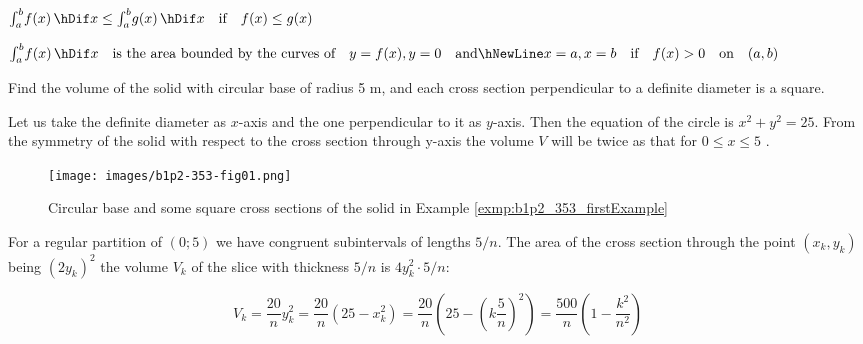 \documentclass[11pt]{amsbook}
\begin{document}

	\begin{hEnumerateArabic}
		\item
		$ 
		\int_{a}^{b} \! f(x) \, \hDif x
		\leq
		\int_{a}^{b} \! g(x) \, \hDif x
		\quad \text{if} \quad
		f(x) \leq g(x)
		$

		\item
		$
		\int_{a}^{b} \! f(x) \, \hDif x
		\quad \text{is the area bounded by the curves of} \quad
		y = f(x), y = 0
		\quad \text{and} \hNewLine
		x = a, x = b
		\quad \text{if} \quad
		f(x) > 0
		\quad \text{on} \quad
		(a,b)
		$
	\end{hEnumerateArabic}


\begin{exmp}
\label{exmp:b1p2_353_firstExample} 
	Find the volume of the solid with circular base of radius 5 m,
	and each cross section perpendicular to a definite diameter is a square.
	
	\begin{hSolution}
		Let us take the definite diameter as
		$ x $-axis
		and the one perpendicular to it as 
		$ y $-axis.
		Then the equation of the circle is
		$ x^{2} + y^{2} = 25 $.
		From the symmetry of the solid with respect to the cross section through y-axis
		the volume
		$ V $
		will be twice as that for
		$ 0 \leq x \leq 5 $
		.

		\begin{figure}[h]
		  \begin{center}
		    \texttt{[image: images/b1p2-353-fig01.png]}
		  \end{center}
		  \caption{Circular base and some square cross sections of the solid in Example \ref{exmp:b1p2_353_firstExample}}
		\end{figure}

		For a regular partition of
		$ (0; 5) $
		we have congruent subintervals of lengths
		$ 5/n $.
		The area of the cross section through the point
		$ (x_{k}, y_{k}) $
		being
		$ (2y_{k})^{2} $
		the volume
		$ V_{k} $
		of the slice with thickness
		$ 5/n $
		is
		$ 4y_{k}^{2} \cdot 5/n $:

		\begin{equation}
			V_{k} 
			= \frac{20}{n} y_{k}^{2} 
			= \frac{20}{n} (25 - x_{k}^{2}) 
			= \frac{20}{n} ( 25 - \left( k \frac{5}{n} \right) ^{2} ) 
			= \frac{500}{n} \left( 1 - \frac{ k^{2} }{ n^{2} } \right)
		\end{equation}


\end{hSolution}
\end{exmp}
\end{document}
